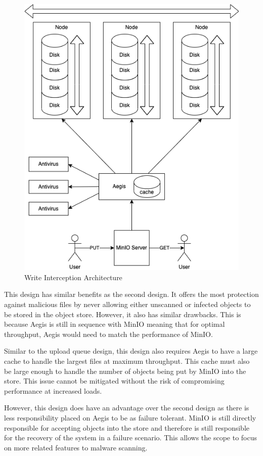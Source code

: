 \documentclass[12pt, conference, final, a4paper, onecolumn, compsoc]{IEEEtran}
\begin{document}
\begin{figure}
  \centering \includegraphics[scale=.3]{diagrams/write-intercept.png}
  \caption{Write Interception Architecture}
  \label{fig:writeInterceptArch}
\end{figure}

This design has similar benefits as the second design. It offers the most
protection against malicious files by never allowing either unscanned or
infected objects to be stored in the object store. However, it also has similar
drawbacks. This is because Aegis is still in sequence with MinIO meaning that
for optimal throughput, Aegis would need to match the performance of MinIO.

Similar to the upload queue design, this design also requires Aegis to have a
large cache to handle the largest files at maximum throughput. This cache must
also be large enough to handle the number of objects being put by MinIO into the
store. This issue cannot be mitigated without the risk of compromising
performance at increased loads.

However, this design does have an advantage over the second design as there is
less responsibility placed on Aegis to be as failure tolerant. MinIO is still
directly responsible for accepting objects into the store and therefore is still
responsible for the recovery of the system in a failure scenario. This allows
the scope to focus on more related features to malware scanning.
\end{document}
